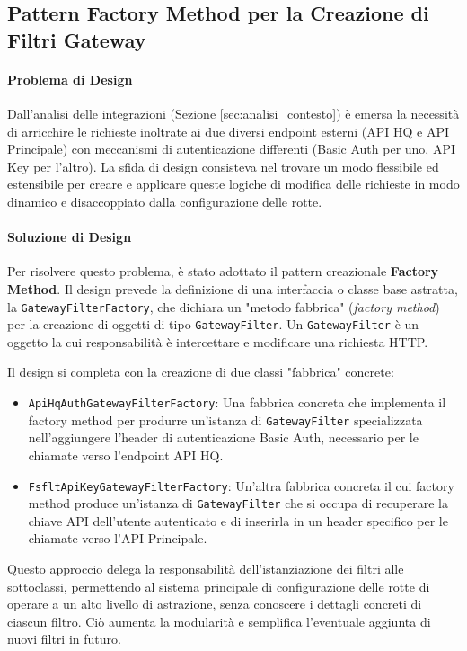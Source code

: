 \documentclass[12pt,a4paper,openright,twoside]{book}
\begin{document}
\subsection{Pattern Factory Method per la Creazione di Filtri Gateway}
\label{subsec:design_factory}

\paragraph{Problema di Design}
Dall'analisi delle integrazioni (Sezione \ref{sec:analisi_contesto}) è emersa la necessità di arricchire le richieste inoltrate ai due diversi endpoint esterni (API HQ e API Principale) con meccanismi di autenticazione differenti (Basic Auth per uno, API Key per l'altro). La sfida di design consisteva nel trovare un modo flessibile ed estensibile per creare e applicare queste logiche di modifica delle richieste in modo dinamico e disaccoppiato dalla configurazione delle rotte.


\paragraph{Soluzione di Design}
Per risolvere questo problema, è stato adottato il pattern creazionale \textbf{Factory Method}. Il design prevede la definizione di una interfaccia o classe base astratta, la \texttt{GatewayFilterFactory}, che dichiara un "metodo fabbrica" (\textit{factory method}) per la creazione di oggetti di tipo \texttt{GatewayFilter}. Un \texttt{GatewayFilter} è un oggetto la cui responsabilità è intercettare e modificare una richiesta HTTP.

Il design si completa con la creazione di due classi "fabbrica" concrete:
\begin{itemize}
    \item \texttt{ApiHqAuthGatewayFilterFactory}: Una fabbrica concreta che implementa il factory method per produrre un'istanza di \texttt{GatewayFilter} specializzata nell'aggiungere l'header di autenticazione Basic Auth, necessario per le chiamate verso l'endpoint API HQ.
    \item \texttt{FsfltApiKeyGatewayFilterFactory}: Un'altra fabbrica concreta il cui factory method produce un'istanza di \texttt{GatewayFilter} che si occupa di recuperare la chiave API dell'utente autenticato e di inserirla in un header specifico per le chiamate verso l'API Principale.
\end{itemize}
Questo approccio delega la responsabilità dell'istanziazione dei filtri alle sottoclassi, permettendo al sistema principale di configurazione delle rotte di operare a un alto livello di astrazione, senza conoscere i dettagli concreti di ciascun filtro. Ciò aumenta la modularità e semplifica l'eventuale aggiunta di nuovi filtri in futuro.
\end{document}
